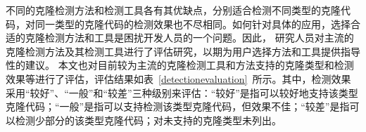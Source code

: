 不同的克隆检测方法和检测工具各有其优缺点，分别适合检测不同类型的克隆代码，对同一类型的克隆代码的检测效果也不尽相同。如何针对具体的应用，选择合适的克隆检测方法和工具是困扰开发人员的一个问题。因此，
研究人员对主流的克隆检测方法及其检测工具进行了评估研究，以期为用户选择方法和工具提供指导性的建议\cite{bellon2007comparison}\cite{rattan2013software}\cite{roy2009comparison}\cite{svajlenko2014evaluating}。%
本文也对目前较为主流的克隆检测工具和方法支持的克隆类型和检测效果等进行了评估，评估结果如表~\ref{detectionevaluation}~所示。其中，检测效果采用“较好”、“一般”和“较差”三种级别来评估：“较好”是指可以较好地支持该类型克隆代码；“一般”是指可以支持检测该类型克隆代码，但效果不佳；“较差”是指可以检测少部分的该类型克隆代码；对未支持的克隆类型未列出。

